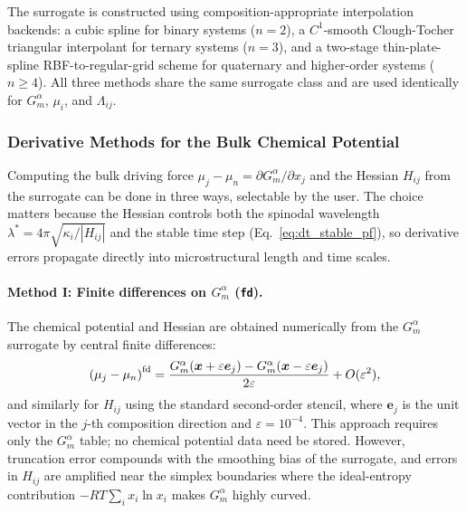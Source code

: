 The surrogate is constructed using composition-appropriate
interpolation backends: a cubic spline for binary systems ($n=2$), a
$C^1$-smooth Clough-Tocher triangular interpolant
\cite{clough_tocher1965} for ternary systems ($n=3$), and a
two-stage thin-plate-spline RBF-to-regular-grid scheme
\cite{scipy2020} for quaternary and higher-order systems ($n \geq
4$).  All three methods share the same surrogate class and are used
identically for $G^\alpha_m$, $\mu_i$, and $\Lambda_{ij}$.

\subsubsection{Derivative Methods for the Bulk Chemical Potential}
\label{sec:deriv_methods_pf}

Computing the bulk driving force $\mu_j - \mu_n = \partial
G^\alpha_m/\partial x_j$ and the Hessian $H_{ij}$ from the surrogate
can be done in three ways, selectable by the user.  The choice
matters because the Hessian controls both the spinodal wavelength
$\lambda^* = 4\pi\sqrt{\kappa_i/|H_{ij}|}$ and the stable time step
(Eq.~\ref{eq:dt_stable_pf}), so derivative errors propagate
directly into microstructural length and time scales.

\paragraph{Method I: Finite differences on $G^\alpha_m$ (\texttt{fd}).}
The chemical potential and Hessian are obtained numerically from the
$G^\alpha_m$ surrogate by central finite differences:
%
\begin{equation}\label{eq:fd_mu_pf}
    \left(\mu_j - \mu_n\right)^{\rm fd}
    = \frac{G^\alpha_m(\boldsymbol{x} + \varepsilon\boldsymbol{e}_j)
            - G^\alpha_m(\boldsymbol{x} - \varepsilon\boldsymbol{e}_j)}
           {2\varepsilon}
    + O(\varepsilon^2),
\end{equation}
%
and similarly for $H_{ij}$ using the standard second-order stencil,
where $\boldsymbol{e}_j$ is the unit vector in the $j$-th composition
direction and $\varepsilon = 10^{-4}$.  This approach requires only the
$G^\alpha_m$ table; no chemical potential data need be stored.
However, truncation error compounds with the smoothing bias of the
surrogate, and errors in $H_{ij}$ are amplified near the simplex
boundaries where the ideal-entropy contribution
$-RT\sum_i x_i \ln x_i$ makes $G^\alpha_m$ highly curved.

